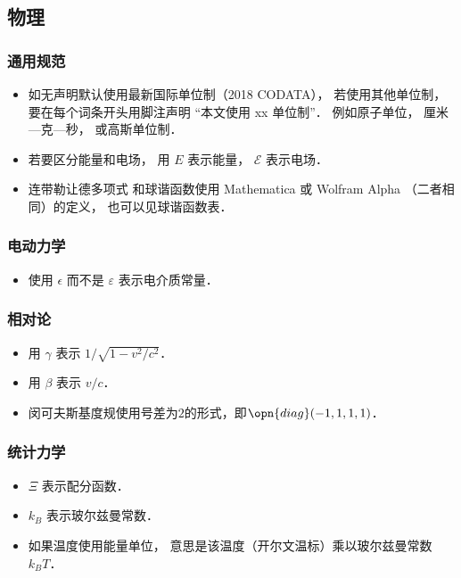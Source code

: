 \subsection{物理}
\subsubsection{通用规范}
\begin{itemize}
\item 如无声明默认使用最新国际单位制（2018 CODATA）， 若使用其他单位制， 要在每个词条开头用脚注声明 “本文使用 xx 单位制”． 例如原子单位， 厘米—克—秒， 或高斯单位制．
\item 若要区分能量和电场， 用 $E$ 表示能量， $\mathcal E$ 表示电场．
\item 连带勒让德多项式 和球谐函数使用 Mathematica 或 Wolfram Alpha （二者相同）的定义， 也可以见球谐函数表．
\end{itemize}

\subsubsection{电动力学}
\begin{itemize}
\item 使用 $\epsilon$ 而不是 $\varepsilon$ 表示电介质常量．
\end{itemize}

\subsubsection{相对论}
\begin{itemize}
\item 用 $\gamma$ 表示 $1/\sqrt{1 - v^2/c^2}$．
\item 用 $\beta$ 表示 $v/c$．
\item 闵可夫斯基度规使用号差为$2$的形式，即$\opn{diag}(-1, 1, 1, 1)$．
\end{itemize}

\subsubsection{统计力学}
\begin{itemize}
\item $\Xi$ 表示配分函数．
\item $k_B$ 表示玻尔兹曼常数．
\item 如果温度使用能量单位， 意思是该温度（开尔文温标）乘以玻尔兹曼常数 $k_B T$．
\end{itemize}
